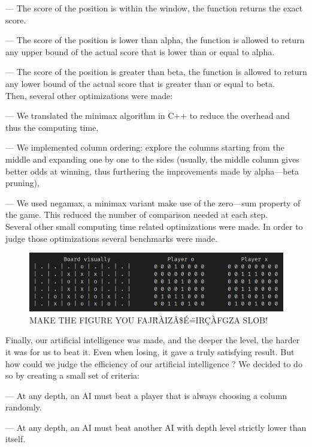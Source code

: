 \documentclass[11pt, a4paper, oneside]{report}
\begin{document}
	— The score of the position is within the window, the function returns the exact score.
	
	— The score of the position is lower than alpha, the function is allowed to return any upper bound of the actual score that is lower than or equal to alpha.

	— The score of the position is greater than beta, the function is allowed to return any lower bound of the actual score that is greater than or equal to beta. \\
	Then, several other optimizations were made:
	
	— We translated the minimax algorithm in C++ to reduce the overhead and thus the computing time,

	— We implemented column ordering: explore the columns starting from the middle and expanding one by one to the sides (usually, the middle column gives better odds at winning, thus furthering the improvements made by alpha—beta pruning),

	— We used negamax, a minimax variant make use of the zero—sum property of the game. This reduced the number of comparison needed at each step. \\

	Several other small computing time related optimizations were made. In order to judge those optimizations several benchmarks were made.
	\begin{figure}[ht]
		\includegraphics[scale=0.4]{example.png}
		\centering
		\caption{MAKE THE FIGURE YOU FAJ\^RÀIZÂ\$É\"=IRÇÀFGZA SLOB!}\label{fig:ai_benchmarks}
	\end{figure}

	Finally, our artificial intelligence was made, and the deeper the level, the harder it was for us to beat it. Even when losing, it gave a truly satisfying result. But how could we judge the efficiency of our artificial intelligence ? We decided to do so by creating a small set of criteria:

	— At any depth, an AI must beat a player that is always choosing a column randomly.

	— At any depth, an AI must beat another AI with depth level strictly lower than itself.
\end{document}
